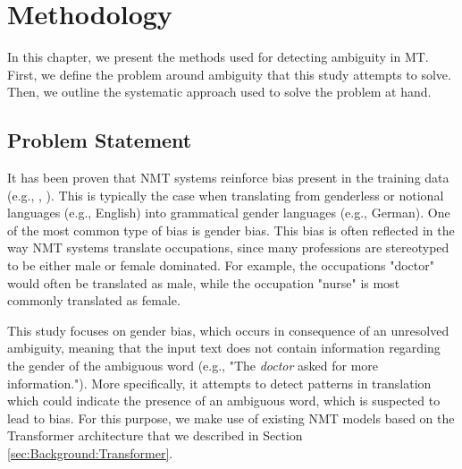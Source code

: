 \chapter{Methodology}
\label{ch:Methodology}


In this chapter, we present the methods used for detecting ambiguity in MT. First, we define the problem around ambiguity that this study attempts to solve. Then, we outline the systematic approach used to solve the problem at hand.

\section{Problem Statement}
\label{sec:Methodology:Problem}

It has been proven that NMT systems reinforce bias present in the training data (e.g., \citet{Prates_2019}, \citet{Stanovsky_2019}). This is typically the case when translating from genderless or notional languages (e.g., English) into grammatical gender languages (e.g., German). One of the most common type of bias is gender bias. 
This bias is often reflected in the way NMT systems translate occupations, since many professions are stereotyped to be either male or female dominated. For example, the occupations "doctor" would often be translated as male, while the occupation "nurse" is most commonly translated as female. 

This study focuses on gender bias, which occurs in consequence of an unresolved ambiguity, meaning that the input text does not contain information regarding the gender of the ambiguous word (e.g., "The \textit{doctor} asked for more information."). More specifically, it attempts to detect patterns in translation which could indicate the presence of an ambiguous word, which is suspected to lead to bias. For this purpose, we make use of existing NMT models based on the Transformer architecture that we described in Section \ref{sec:Background:Transformer}.
 

